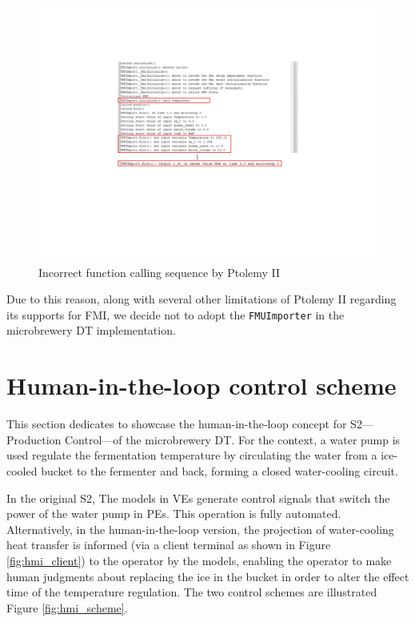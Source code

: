 \begin{figure}[hbt!]
  \centering
  \includegraphics[scale=0.8]{figures/fmi_error.pdf}
  \caption {Incorrect function calling sequence by Ptolemy II}
  \label{fig:fmi_error}
\end{figure}

Due to this reason, along with several other limitations of Ptolemy II regarding its supports for FMI, we decide not to adopt the \texttt{FMUImporter} in the microbrewery DT implementation.

\chapter{Human-in-the-loop control scheme} \label{apd:humanloop}
This section dedicates to showcase the human-in-the-loop concept for S2---Production Control---of the microbrewery DT. For the context, a water pump is used regulate the fermentation temperature by circulating the water from a ice-cooled bucket to the fermenter and back, forming a closed water-cooling circuit. 

In the original S2, The models in VEs generate control signals that switch the power of the water pump in PEs. This operation is fully automated. Alternatively, in the human-in-the-loop version, the projection of water-cooling heat transfer is informed (via a client terminal as shown in Figure \ref{fig:hmi_client}) to the operator by the models, enabling the operator to make human judgments about replacing the ice in the bucket in order to alter the effect time of the temperature regulation. The two control schemes are illustrated Figure \ref{fig:hmi_scheme}.

